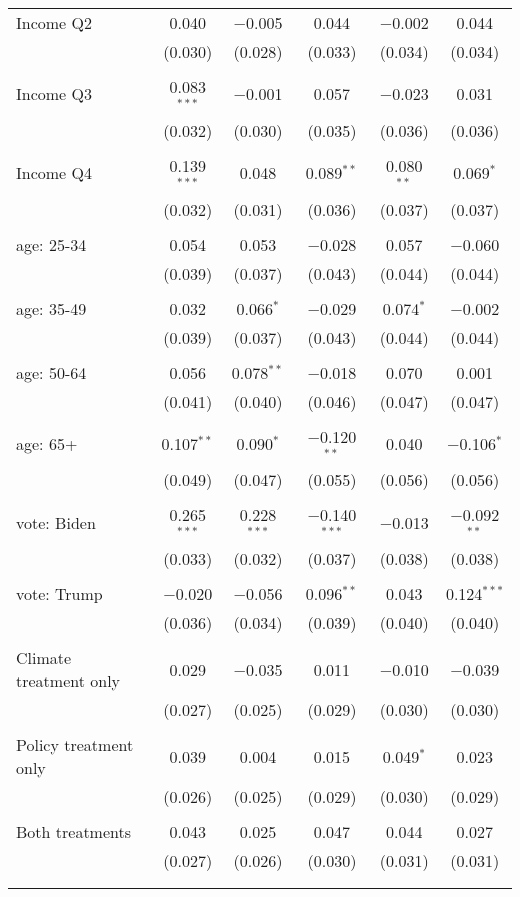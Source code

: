\begin{tabular}{@{\extracolsep{5pt}}lccccc}
 Income Q2 & 0.040 & $-$0.005 & 0.044 & $-$0.002 & 0.044 \\ 
  & (0.030) & (0.028) & (0.033) & (0.034) & (0.034) \\ 
  & & & & & \\ 
 Income Q3 & 0.083$^{***}$ & $-$0.001 & 0.057 & $-$0.023 & 0.031 \\ 
  & (0.032) & (0.030) & (0.035) & (0.036) & (0.036) \\ 
  & & & & & \\ 
 Income Q4 & 0.139$^{***}$ & 0.048 & 0.089$^{**}$ & 0.080$^{**}$ & 0.069$^{*}$ \\ 
  & (0.032) & (0.031) & (0.036) & (0.037) & (0.037) \\ 
  & & & & & \\ 
 age: 25-34 & 0.054 & 0.053 & $-$0.028 & 0.057 & $-$0.060 \\ 
  & (0.039) & (0.037) & (0.043) & (0.044) & (0.044) \\ 
  & & & & & \\ 
 age: 35-49 & 0.032 & 0.066$^{*}$ & $-$0.029 & 0.074$^{*}$ & $-$0.002 \\ 
  & (0.039) & (0.037) & (0.043) & (0.044) & (0.044) \\ 
  & & & & & \\ 
 age: 50-64 & 0.056 & 0.078$^{**}$ & $-$0.018 & 0.070 & 0.001 \\ 
  & (0.041) & (0.040) & (0.046) & (0.047) & (0.047) \\ 
  & & & & & \\ 
 age: 65+ & 0.107$^{**}$ & 0.090$^{*}$ & $-$0.120$^{**}$ & 0.040 & $-$0.106$^{*}$ \\ 
  & (0.049) & (0.047) & (0.055) & (0.056) & (0.056) \\ 
  & & & & & \\ 
 vote: Biden & 0.265$^{***}$ & 0.228$^{***}$ & $-$0.140$^{***}$ & $-$0.013 & $-$0.092$^{**}$ \\ 
  & (0.033) & (0.032) & (0.037) & (0.038) & (0.038) \\ 
  & & & & & \\ 
 vote: Trump & $-$0.020 & $-$0.056 & 0.096$^{**}$ & 0.043 & 0.124$^{***}$ \\ 
  & (0.036) & (0.034) & (0.039) & (0.040) & (0.040) \\ 
  & & & & & \\ 
 Climate treatment only & 0.029 & $-$0.035 & 0.011 & $-$0.010 & $-$0.039 \\ 
  & (0.027) & (0.025) & (0.029) & (0.030) & (0.030) \\ 
  & & & & & \\ 
 Policy treatment only & 0.039 & 0.004 & 0.015 & 0.049$^{*}$ & 0.023 \\ 
  & (0.026) & (0.025) & (0.029) & (0.030) & (0.029) \\ 
  & & & & & \\ 
 Both treatments & 0.043 & 0.025 & 0.047 & 0.044 & 0.027 \\ 
  & (0.027) & (0.026) & (0.030) & (0.031) & (0.031) \\ 
  & & & & & \\ 
\hline \\[-1.8ex] 


\end{tabular}
